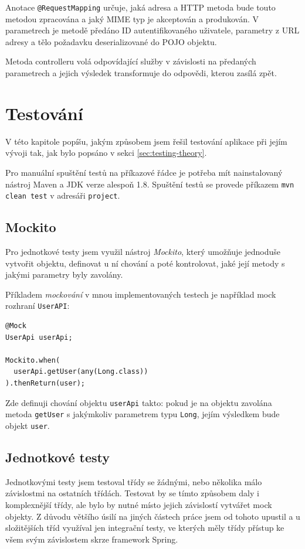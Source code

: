 \documentclass[thesis=B,czech]{FITthesis}[2012/06/26]
\begin{document}
	Anotace \texttt{@RequestMapping} určuje, jaká adresa a HTTP metoda bude touto metodou zpracována a jaký MIME typ \cite{mime-type} je akceptován a produkován. V parametrech je metodě předáno ID autentifikovaného uživatele, parametry z URL adresy a tělo požadavku deserializované do POJO objektu. 
	
	Metoda controlleru volá odpovídající služby v závislosti na předaných parametrech a jejich výsledek transformuje do odpovědi, kterou zasílá zpět.
	


\chapter{Testování}
	\label{chapter:testing}
	
	V této kapitole popíšu, jakým způsobem jsem řešil testování aplikace při jejím vývoji tak, jak bylo popsáno v sekci \ref{sec:testing-theory}. 

	Pro manuální spuštění testů na příkazové řádce je potřeba mít nainstalovaný nástroj Maven a JDK verze alespoň 1.8. Spuštění testů se provede příkazem \texttt{mvn clean test} v adresáři \texttt{project}.
	
	\section{Mockito}
		Pro jednotkové testy jsem využil nástroj \textit{Mockito}, který umožňuje jednoduše vytvořit  objektu, definovat u ní chování a poté kontrolovat, jaké její metody s jakými parametry byly zavolány.
			
			Příkladem \textit{mockování} v mnou implementovaných testech je například mock rozhraní \texttt{UserAPI}:
			\begin{Verbatim}
@Mock
UserApi userApi;

Mockito.when(
  userApi.getUser(any(Long.class))
).thenReturn(user);
			\end{Verbatim}
			Zde definuji chování objektu \texttt{userApi} takto: pokud je na objektu zavolána metoda \texttt{getUser} s jakýmkoliv parametrem typu \texttt{Long}, jejím výsledkem bude objekt \texttt{user}.
		
		
	\section{Jednotkové testy}
		Jednotkovými testy jsem testoval třídy se žádnými, nebo několika málo závislostmi na ostatních třídách. Testovat by se tímto způsobem daly i komplexnější třídy, ale bylo by nutné místo jejich závislostí vytvářet mock objekty. Z důvodu většího úsilí na jiných částech práce jsem od tohoto upustil a u složitějších tříd využíval jen integrační testy, ve kterých měly třídy přístup ke všem svým závislostem skrze framework Spring.
	
\end{document}
